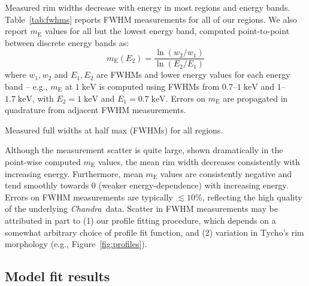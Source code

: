 \documentclass[iop, apj, numberedappendix]{emulateapj}
\newcommand*{\mt}{\mathrm}
\newcommand*{\unit}[1]{\;\mt{#1}}  %
\newcommand*{\Chandra}{\textit{Chandra}\ }
\newcommand*{\mE}{m_\mt{E}}
\begin{document}
Measured rim widths decrease with energy in most regions and energy bands.
Table~\ref{tab:fwhms} reports FWHM measurements for all of our regions.
We also report $\mE$ values for all but the lowest energy band, computed
point-to-point between discrete energy bands as:
\begin{equation}
    \mE(E_2) = \frac{\ln(w_2/w_1)}{\ln(E_2/E_1)}
\end{equation}
where $w_1, w_2$ and $E_1, E_2$ are FWHMs and lower energy values for each
energy band -- e.g., $\mE$ at $1 \unit{keV}$ is computed using FWHMs from
$0.7$--$1 \unit{keV}$ and $1$--$1.7 \unit{keV}$, with $E_2 = 1 \unit{keV}$ and
$E_1 = 0.7 \unit{keV}$.  Errors on $\mE$ are propagated in quadrature from
adjacent FWHM measurements.

\begin{table*}
    \iftoggle{manuscript}{
        \tiny
    }{
        \scriptsize
    }
    \centering
    \caption{Measured full widths at half max (FWHMs) for all regions.
             \label{tab:fwhms}}
    
\end{table*}

Although the measurement scatter is quite large, shown dramatically in the
point-wise computed $\mE$ values, the mean rim width decreases consistently
with increasing energy.  Furthermore, mean $\mE$ values are consistently
negative and tend smoothly towards $0$ (weaker energy-dependence) with
increasing energy.  Errors on FWHM measurements are typically $\lesssim 10\%$,
reflecting the high quality of the underlying \Chandra data.  Scatter in FWHM
measurements may be attributed in part to (1) our profile fitting procedure,
which depends on a somewhat arbitrary choice of profile fit function, and (2)
variation in Tycho's rim morphology (e.g., Figure~\ref{fig:profiles}).

\subsection{Model fit results}
\label{sec:fit-results}


\end{document}
